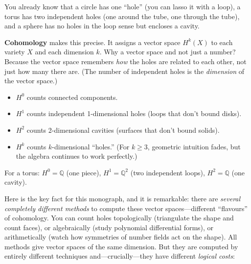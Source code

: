 \documentclass[11pt,twoside,openany]{report}
\theoremstyle{remark}
\begin{document}
You already know that a circle has one ``hole'' (you can lasso it with a loop), a torus has two independent holes (one around the tube, one through the tube), and a sphere has no holes in the loop sense but encloses a cavity.

\textbf{Cohomology} makes this precise. It assigns a vector space $H^k(X)$ to each variety $X$ and each dimension $k$. Why a vector space and not just a number? Because the vector space remembers \emph{how} the holes are related to each other, not just how many there are. (The number of independent holes is the \emph{dimension} of the vector space.)
\begin{itemize}
  \item $H^0$ counts connected components.
  \item $H^1$ counts independent 1-dimensional holes (loops that don't bound disks).
  \item $H^2$ counts 2-dimensional cavities (surfaces that don't bound solids).
  \item $H^k$ counts $k$-dimensional ``holes.'' (For $k \geq 3$, geometric intuition fades, but the algebra continues to work perfectly.)
\end{itemize}

For a torus: $H^0 = \mathbb{Q}$ (one piece), $H^1 = \mathbb{Q}^2$ (two independent loops), $H^2 = \mathbb{Q}$ (one cavity).

Here is the key fact for this monograph, and it is remarkable: there are \emph{several completely different methods} to compute these vector spaces---different ``flavours'' of cohomology. You can count holes topologically (triangulate the shape and count faces), or algebraically (study polynomial differential forms), or arithmetically (watch how symmetries of number fields act on the shape). All methods give vector spaces of the same dimension. But they are computed by entirely different techniques and---crucially---they have different \emph{logical costs}:
\end{document}
